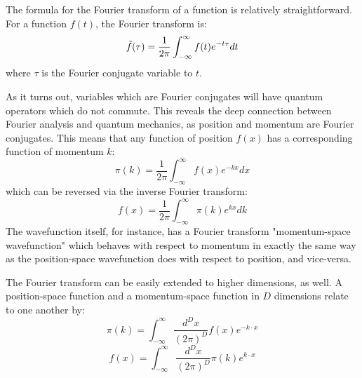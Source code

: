 \documentclass{report}
\begin{document}
\begin{appendices}
The formula for the Fourier transform of a function is relatively straightforward. For a function $f(t)$, the Fourier transform is:
\[
\Tilde{f}(\tau) = \frac{1}{2\pi} \int_{-\infty}^{\infty} f(t)e^{-t\tau} dt
\]
where $\tau$ is the Fourier conjugate variable to $t$.

As it turns out, variables which are Fourier conjugates will have quantum operators which do not commute. This reveals the deep connection between Fourier analysis and quantum mechanics, as position and momentum are Fourier conjugates. This means that any function of position $f(x)$ has a corresponding function of momentum $k$:
\[
\pi(k) = \frac{1}{2\pi} \int_{-\infty}^{\infty} f(x)e^{-kx} dx
\]
which can be reversed via the inverse Fourier transform:
\[
f(x) = \frac{1}{2\pi} \int_{-\infty}^{\infty} \pi(k) e^{kx} dk
\]
The wavefunction itself, for instance, has a Fourier transform "momentum-space wavefunction" which behaves with respect to momentum in exactly the same way as the position-space wavefunction does with respect to position, and vice-versa.

The Fourier transform can be easily extended to higher dimensions, as well. A position-space function and a momentum-space function in $D$ dimensions relate to one another by:
\[
\pi(k) = \int_{-\infty}^{\infty} \frac{d^D x}{(2\pi)^D} f(x)e^{-k \cdot x}
\]
\[
f(x) = \int_{-\infty}^{\infty} \frac{d^D x}{(2\pi)^D} \pi(k) e^{k \cdot x}
\]

\end{appendices}
\end{document}
